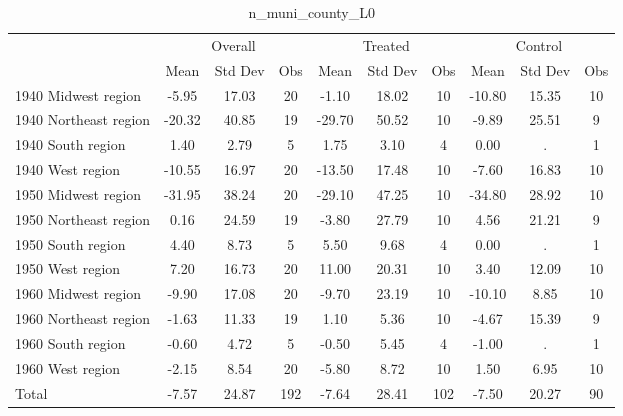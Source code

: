 \begin{table}[htbp]\centering
\def\sym#1{\ifmmode^{#1}\else\(^{#1}\)\fi}
\caption{n\_muni\_county\_L0 \label{tab1}}
\begin{tabular}{l*{3}{ccc}}
\toprule
                    &\multicolumn{3}{c}{Overall}           &\multicolumn{3}{c}{Treated}           &\multicolumn{3}{c}{Control}           \\
                    &        Mean&     Std Dev&         Obs&        Mean&     Std Dev&         Obs&        Mean&     Std Dev&         Obs\\
\midrule
1940 Midwest region &       -5.95&       17.03&          20&       -1.10&       18.02&          10&      -10.80&       15.35&          10\\
1940 Northeast region&      -20.32&       40.85&          19&      -29.70&       50.52&          10&       -9.89&       25.51&           9\\
1940 South region   &        1.40&        2.79&           5&        1.75&        3.10&           4&        0.00&           .&           1\\
1940 West region    &      -10.55&       16.97&          20&      -13.50&       17.48&          10&       -7.60&       16.83&          10\\
1950 Midwest region &      -31.95&       38.24&          20&      -29.10&       47.25&          10&      -34.80&       28.92&          10\\
1950 Northeast region&        0.16&       24.59&          19&       -3.80&       27.79&          10&        4.56&       21.21&           9\\
1950 South region   &        4.40&        8.73&           5&        5.50&        9.68&           4&        0.00&           .&           1\\
1950 West region    &        7.20&       16.73&          20&       11.00&       20.31&          10&        3.40&       12.09&          10\\
1960 Midwest region &       -9.90&       17.08&          20&       -9.70&       23.19&          10&      -10.10&        8.85&          10\\
1960 Northeast region&       -1.63&       11.33&          19&        1.10&        5.36&          10&       -4.67&       15.39&           9\\
1960 South region   &       -0.60&        4.72&           5&       -0.50&        5.45&           4&       -1.00&           .&           1\\
1960 West region    &       -2.15&        8.54&          20&       -5.80&        8.72&          10&        1.50&        6.95&          10\\
Total               &       -7.57&       24.87&         192&       -7.64&       28.41&         102&       -7.50&       20.27&          90\\
\bottomrule
\end{tabular}
\end{table}
